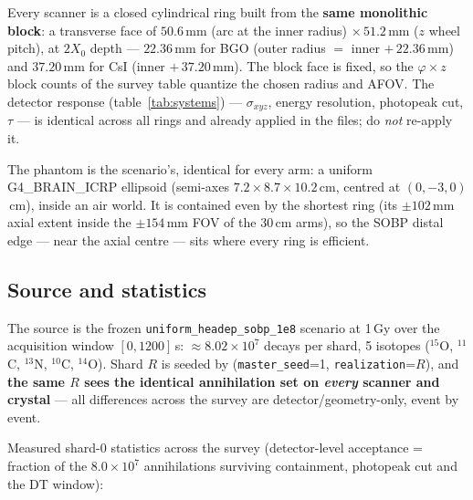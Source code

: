 \documentclass[11pt,a4paper]{article}
\begin{document}
Every scanner is a closed cylindrical ring built from the \textbf{same monolithic block}: a
transverse face of $50.6$\,mm (arc at the inner radius) $\times\, 51.2$\,mm ($z$ wheel pitch),
at $2X_0$ depth --- $22.36$\,mm for BGO (outer radius $=$ inner $+\,22.36$\,mm) and $37.20$\,mm
for CsI (inner $+\,37.20$\,mm). The block face is fixed, so the $\varphi\times z$ block counts of
the survey table quantize the chosen radius and AFOV. The detector response
(table~\ref{tab:systems}) --- $\sigma_{xyz}$, energy resolution, photopeak cut, $\tau$ --- is
identical across all rings and already applied in the files; do \emph{not} re-apply it.

The phantom is the scenario's, identical for every arm: a uniform G4\_BRAIN\_ICRP ellipsoid
(semi-axes $7.2 \times 8.7 \times 10.2$\,cm, centred at $(0, -3, 0)$\,cm), inside an air world.
It is contained even by the shortest ring (its $\pm 102$\,mm axial extent inside the
$\pm 154$\,mm FOV of the 30\,cm arms), so the SOBP distal edge --- near the axial centre --- sits
where every ring is efficient.

\subsection*{Source and statistics}

The source is the frozen \texttt{uniform\_headep\_sobp\_1e8} scenario at 1\,Gy over the
acquisition window $[0, 1200]$\,s: ${\approx}8.02\times10^7$ decays per shard,
5 isotopes ($^{15}$O, $^{11}$C, $^{13}$N, $^{10}$C, $^{14}$O). Shard $R$ is seeded by
(\texttt{master\_seed}=1, \texttt{realization}=$R$), and \textbf{the same $R$ sees the identical
annihilation set on \emph{every} scanner and crystal} --- all differences across the survey are
detector/geometry-only, event by event.

Measured shard-0 statistics across the survey (detector-level acceptance = fraction of the
$8.0\times10^7$ annihilations surviving containment, photopeak cut and the DT window):
\end{document}
